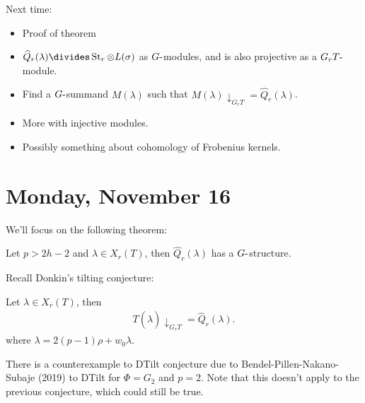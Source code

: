 
Next time:

\begin{itemize}
\item
  Proof of theorem
\item
  \(\widehat{Q}_r(\lambda) \divides \operatorname{St}_r \otimes L(\sigma)\)
  as \(G{\hbox{-}}\)modules, and is also projective as a
  \(G_r T{\hbox{-}}\)module.
\item
  Find a \(G{\hbox{-}}\)summand \(M(\lambda)\) such that
  \(M(\lambda)\downarrow_{G_r T} = \widehat{Q}_r (\lambda)\).
\item
  More with injective modules.
\item
  Possibly something about cohomology of Frobenius kernels.
\end{itemize}

\hypertarget{monday-november-16}{%
\section{Monday, November 16}\label{monday-november-16}}

We'll focus on the following theorem:

\begin{theorem}

Let \(p> 2h-2\) and \(\lambda\in X_r(T)\), then
\(\widehat{Q}_r(\lambda)\) has a \(G{\hbox{-}}\)structure.

\end{theorem}

Recall Donkin's tilting conjecture:

\begin{conjecture}[DTilt]

Let \(\lambda\in X_r(T)\), then
\begin{align*}  
T(\widehat{\lambda})\downarrow_{G_r T} = \widehat{Q}_r(\lambda)
.\end{align*}
where \(\lambda = 2(p-1)\rho + w_0\lambda\).

\end{conjecture}

\begin{remark}

There is a counterexample to DTilt conjecture due to
Bendel-Pillen-Nakano-Subaje (2019) to DTilt for \(\Phi = G_2\) and
\(p=2\). Note that this doesn't apply to the previous conjecture, which
could still be true.

\end{remark}

